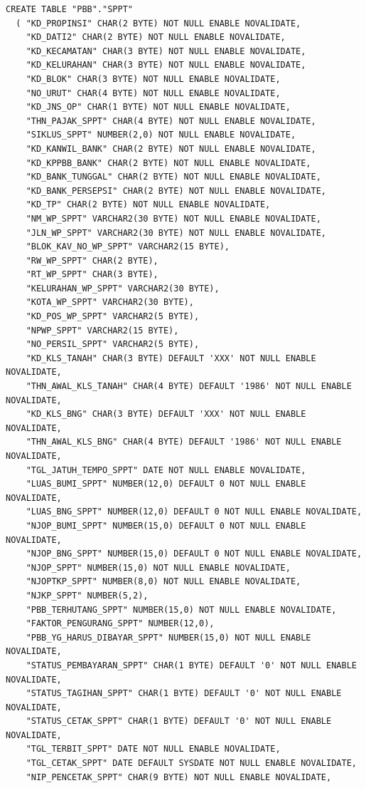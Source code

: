 \documentclass[pdftex,12pt, oneside]{article}
\begin{document}
\begin{enumerate}[1.]
\begin{itemize}
	\begin{lstlisting}
CREATE TABLE "PBB"."SPPT" 
  (	"KD_PROPINSI" CHAR(2 BYTE) NOT NULL ENABLE NOVALIDATE, 
	"KD_DATI2" CHAR(2 BYTE) NOT NULL ENABLE NOVALIDATE, 
	"KD_KECAMATAN" CHAR(3 BYTE) NOT NULL ENABLE NOVALIDATE, 
	"KD_KELURAHAN" CHAR(3 BYTE) NOT NULL ENABLE NOVALIDATE, 
	"KD_BLOK" CHAR(3 BYTE) NOT NULL ENABLE NOVALIDATE, 
	"NO_URUT" CHAR(4 BYTE) NOT NULL ENABLE NOVALIDATE, 
	"KD_JNS_OP" CHAR(1 BYTE) NOT NULL ENABLE NOVALIDATE, 
	"THN_PAJAK_SPPT" CHAR(4 BYTE) NOT NULL ENABLE NOVALIDATE, 
	"SIKLUS_SPPT" NUMBER(2,0) NOT NULL ENABLE NOVALIDATE, 
	"KD_KANWIL_BANK" CHAR(2 BYTE) NOT NULL ENABLE NOVALIDATE, 
	"KD_KPPBB_BANK" CHAR(2 BYTE) NOT NULL ENABLE NOVALIDATE, 
	"KD_BANK_TUNGGAL" CHAR(2 BYTE) NOT NULL ENABLE NOVALIDATE, 
	"KD_BANK_PERSEPSI" CHAR(2 BYTE) NOT NULL ENABLE NOVALIDATE, 
	"KD_TP" CHAR(2 BYTE) NOT NULL ENABLE NOVALIDATE, 
	"NM_WP_SPPT" VARCHAR2(30 BYTE) NOT NULL ENABLE NOVALIDATE, 
	"JLN_WP_SPPT" VARCHAR2(30 BYTE) NOT NULL ENABLE NOVALIDATE, 
	"BLOK_KAV_NO_WP_SPPT" VARCHAR2(15 BYTE), 
	"RW_WP_SPPT" CHAR(2 BYTE), 
	"RT_WP_SPPT" CHAR(3 BYTE), 
	"KELURAHAN_WP_SPPT" VARCHAR2(30 BYTE), 
	"KOTA_WP_SPPT" VARCHAR2(30 BYTE), 
	"KD_POS_WP_SPPT" VARCHAR2(5 BYTE), 
	"NPWP_SPPT" VARCHAR2(15 BYTE), 
	"NO_PERSIL_SPPT" VARCHAR2(5 BYTE), 
	"KD_KLS_TANAH" CHAR(3 BYTE) DEFAULT 'XXX' NOT NULL ENABLE NOVALIDATE, 
	"THN_AWAL_KLS_TANAH" CHAR(4 BYTE) DEFAULT '1986' NOT NULL ENABLE NOVALIDATE, 
	"KD_KLS_BNG" CHAR(3 BYTE) DEFAULT 'XXX' NOT NULL ENABLE NOVALIDATE, 
	"THN_AWAL_KLS_BNG" CHAR(4 BYTE) DEFAULT '1986' NOT NULL ENABLE NOVALIDATE, 
	"TGL_JATUH_TEMPO_SPPT" DATE NOT NULL ENABLE NOVALIDATE, 
	"LUAS_BUMI_SPPT" NUMBER(12,0) DEFAULT 0 NOT NULL ENABLE NOVALIDATE, 
	"LUAS_BNG_SPPT" NUMBER(12,0) DEFAULT 0 NOT NULL ENABLE NOVALIDATE, 
	"NJOP_BUMI_SPPT" NUMBER(15,0) DEFAULT 0 NOT NULL ENABLE NOVALIDATE, 
	"NJOP_BNG_SPPT" NUMBER(15,0) DEFAULT 0 NOT NULL ENABLE NOVALIDATE, 
	"NJOP_SPPT" NUMBER(15,0) NOT NULL ENABLE NOVALIDATE, 
	"NJOPTKP_SPPT" NUMBER(8,0) NOT NULL ENABLE NOVALIDATE, 
	"NJKP_SPPT" NUMBER(5,2), 
	"PBB_TERHUTANG_SPPT" NUMBER(15,0) NOT NULL ENABLE NOVALIDATE, 
	"FAKTOR_PENGURANG_SPPT" NUMBER(12,0), 
	"PBB_YG_HARUS_DIBAYAR_SPPT" NUMBER(15,0) NOT NULL ENABLE NOVALIDATE, 
	"STATUS_PEMBAYARAN_SPPT" CHAR(1 BYTE) DEFAULT '0' NOT NULL ENABLE NOVALIDATE, 
	"STATUS_TAGIHAN_SPPT" CHAR(1 BYTE) DEFAULT '0' NOT NULL ENABLE NOVALIDATE, 
	"STATUS_CETAK_SPPT" CHAR(1 BYTE) DEFAULT '0' NOT NULL ENABLE NOVALIDATE, 
	"TGL_TERBIT_SPPT" DATE NOT NULL ENABLE NOVALIDATE, 
	"TGL_CETAK_SPPT" DATE DEFAULT SYSDATE NOT NULL ENABLE NOVALIDATE, 
	"NIP_PENCETAK_SPPT" CHAR(9 BYTE) NOT NULL ENABLE NOVALIDATE, 


\end{lstlisting}
\end{itemize}
\end{enumerate}
\end{document}
